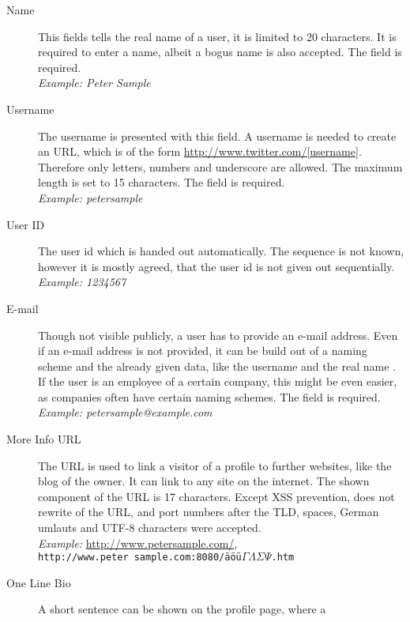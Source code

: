 \begin{description}
\item[Name] This fields tells the real name of a user, it is limited to 20
            characters. It is required to enter a name, albeit a bogus name is
            also accepted. The field is required.\\
            \textit{Example: Peter Sample}
\item[Username] The username is presented with this field. A username is needed
                to create an URL, which is of the form \url{http://www.twitter.com/[username]}.
                Therefore only letters, numbers and underscore are allowed. The maximum length
                is set to 15 characters. The field is required.\\
                \textit{Example: petersample}
\item[User ID] The user id which is handed out automatically. The sequence is
               not known, however it is mostly agreed, that the user id is not given out
               sequentially.\\
               \textit{Example: 1234567}
\item[E-mail] Though not visible publicly, a \Twitter{} user has to provide an
              e-mail address. Even if an e-mail address is not provided, it
              can be build out of a naming scheme and the already
              given data, like the username and the real name \cite{brown2008}. If the user
              is an employee of a certain company, this might be even easier,
              as companies often have certain naming schemes. The field is required.\\
              \textit{Example: petersample@example.com}
\item[More Info URL] The URL is used to link a visitor of a profile to further
                     websites, like the blog of the owner. It can link to
                     any site on the internet. The shown component of the
                     URL is 17 characters. Except XSS prevention,
                     \Twitter{} does not rewrite of the URL, and port numbers
                     after the TLD, spaces, German umlauts and UTF-8 characters were
                     accepted.\\
                     \textit{Example:} \url{http://www.petersample.com/},\\
                     \texttt{http://www.peter sample.com:8080/äöü$\Gamma\Lambda\Sigma\Psi$.htm}
\item[One Line Bio] A short sentence can be shown on the profile page, where a

\end{description}
